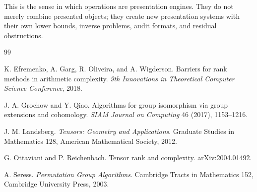 \documentclass[11pt]{article}
\begin{document}
This is the sense in which operations are presentation engines.  They do not merely combine presented objects; they create new presentation systems with their own lower bounds, inverse problems, audit formats, and residual obstructions.

\begin{thebibliography}{99}

K. Efremenko, A. Garg, R. Oliveira, and A. Wigderson.
Barriers for rank methods in arithmetic complexity.
\emph{9th Innovations in Theoretical Computer Science Conference}, 2018.

J. A. Grochow and Y. Qiao.
Algorithms for group isomorphism via group extensions and cohomology.
\emph{SIAM Journal on Computing} 46 (2017), 1153--1216.

J. M. Landsberg.
\emph{Tensors: Geometry and Applications}.
Graduate Studies in Mathematics 128, American Mathematical Society, 2012.

G. Ottaviani and P. Reichenbach.
Tensor rank and complexity.
arXiv:2004.01492.

A. Seress.
\emph{Permutation Group Algorithms}.
Cambridge Tracts in Mathematics 152, Cambridge University Press, 2003.

\end{thebibliography}
\end{document}
